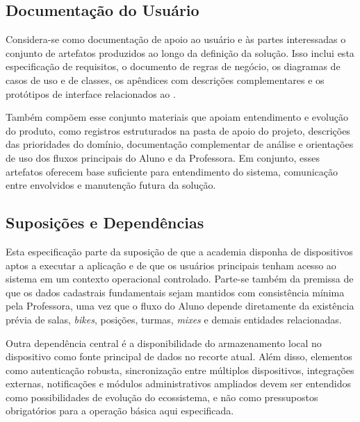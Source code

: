 \subsection{Documentação do Usuário}
Considera-se como documentação de apoio ao usuário e às partes interessadas o conjunto de artefatos produzidos ao longo da definição da solução. Isso inclui esta especificação de requisitos, o documento de regras de negócio, os diagramas de casos de uso e de classes, os apêndices com descrições complementares e os protótipos de interface relacionados ao \ProjetoNome.

Também compõem esse conjunto materiais que apoiam entendimento e evolução do produto, como registros estruturados na pasta de apoio do projeto, descrições das prioridades do domínio, documentação complementar de análise e orientações de uso dos fluxos principais do Aluno e da Professora. Em conjunto, esses artefatos oferecem base suficiente para entendimento do sistema, comunicação entre envolvidos e manutenção futura da solução.

\subsection{Suposições e Dependências}
Esta especificação parte da suposição de que a academia disponha de dispositivos aptos a executar a aplicação e de que os usuários principais tenham acesso ao sistema em um contexto operacional controlado. Parte-se também da premissa de que os dados cadastrais fundamentais sejam mantidos com consistência mínima pela Professora, uma vez que o fluxo do Aluno depende diretamente da existência prévia de salas, \textit{bikes}, posições, turmas, \textit{mixes} e demais entidades relacionadas.

Outra dependência central é a disponibilidade do armazenamento local no dispositivo como fonte principal de dados no recorte atual. Além disso, elementos como autenticação robusta, sincronização entre múltiplos dispositivos, integrações externas, notificações e módulos administrativos ampliados devem ser entendidos como possibilidades de evolução do ecossistema, e não como pressupostos obrigatórios para a operação básica aqui especificada.
